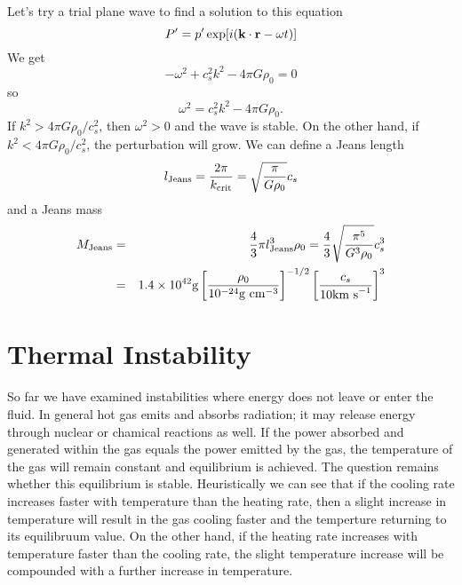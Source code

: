 Let's try a trial plane wave to find a solution to this equation
\begin{equation}
P' = p' \exp[i({\bf k} \cdot {\bf r} - \omega t)]
\label{eq:784}
\end{equation}
We get
\begin{equation}
-\omega^2 + c_s^2 k^2 - 4\pi G \rho_0 = 0
\label{eq:785}
\end{equation}
so
\begin{equation}
\omega^2 = c_s^2 k^2 - 4\pi G \rho_0.
\label{eq:786}
\end{equation}
If $k^2 > 4\pi G \rho_0/c_s^2$, then $\omega^2>0$ and the wave is
stable.  On the other hand, if $k^2 < 4\pi G \rho_0/c_s^2$, the
perturbation will grow.  We can define a Jeans length
\begin{equation}
l_{\hbox{\rm \scriptsize Jeans}} = \frac{2\pi}{k_{\hbox{\rm \scriptsize crit}}} =
\sqrt{\frac{\pi}{G\rho_0}} c_s
\label{eq:787}
\end{equation}
and a Jeans mass
\begin{eqnarray}
M_{\hbox{\rm \scriptsize Jeans}} &=& \frac{4}{3} \pi l_{\hbox{\rm \scriptsize Jeans}}^3 \rho_0 = 
\frac{4}{3} \sqrt{\frac{\pi^5}{G^3 \rho_0}} c_s^3 \\
&=& 1.4 \times 10^{42}\hbox{\rm g}
  \left [ \frac{\rho_0}{10^{-24} \hbox{\rm g cm}^{-3}} \right ]^{-1/2} \left [
  \frac{c_s}{10 \hbox{\rm km s}^{-1}} \right ]^3
\label{eq:788}
\end{eqnarray}

\section{Thermal Instability}

So far we have examined instabilities where energy does not leave or
enter the fluid.  In general hot gas emits and absorbs radiation; it
may release energy through nuclear or chamical reactions as well.   If
the power absorbed and generated within the gas equals the power
emitted by the gas, the temperature of the gas will remain constant
and equilibrium is achieved.  The question remains whether this
equilibrium is stable.  Heuristically we can see that if the cooling
rate increases faster with temperature than the heating rate, then a
slight increase in temperature will result in the gas cooling faster
and the temperture returning to its equilibruum value.  On the other
hand, if the heating rate increases with temperature faster than the
cooling rate, the slight temperature increase will be compounded with
a further increase in temperature.


